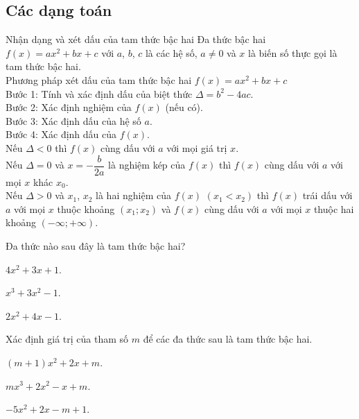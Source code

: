 \subsection{Các dạng toán}
\begin{dang}{Nhận dạng và xét dấu của tam thức bậc hai}
	Đa thức bậc hai $f(x)=ax^2+bx+c$ với $a$, $b$, $c$ là các hệ số, $a\ne 0$ và $x$ là biến số thực gọi là tam thức bậc hai.\\
	Phương pháp xét dấu của tam thức bậc hai $f(x)=ax^2+bx+c$\\
	Bước 1: Tính và xác định dấu của biệt thức $\Delta=b^2-4ac$.\\
	Bước 2: Xác định nghiệm của $f(x)$ (nếu có).\\
	Bước 3: Xác định dấu của hệ số $a$.\\
	Bước 4: Xác định dấu của $f(x)$.\\
	Nếu $\Delta <0$ thì $f(x)$ cùng dấu với $a$ với mọi giá trị $x$.\\
	Nếu $\Delta =0$ và $x=-\dfrac{b}{2a}$ là nghiệm kép của $f(x)$ thì $f(x)$ cùng dấu với $a$ với mọi $x$ khác $x_0$.\\
	Nếu $\Delta>0$ và $x_1$, $x_2$ là hai nghiệm của $f(x)$ $(x_1<x_2)$ thì $f(x)$ trái dấu với $a$ với mọi $x$ thuộc khoảng $(x_1;x_2)$ và $f(x)$ cùng dấu với $a$ với mọi $x$ thuộc hai khoảng $(-\infty;+\infty)$.
\end{dang}
\viduminhhoa
\begin{vd}%
	Đa thức nào sau đây là tam thức bậc hai?
	\begin{listEX}[3]
	\item $4x^2+3x+1$.
	\item $x^3+3x^2-1$.
	\item $2x^2+4x-1$.
	\end{listEX}
\end{vd}
\newpage
\begin{vd}%
	Xác định giá trị của tham số $m$ để các đa thức sau là tam thức bậc hai.
	\begin{listEX}[3]
	\item $(m+1)x^2+2x+m$.
	\item $mx^3+2x^2-x+m$.
	\item $-5x^2+2x-m+1$.
	\end{listEX}
\end{vd}
